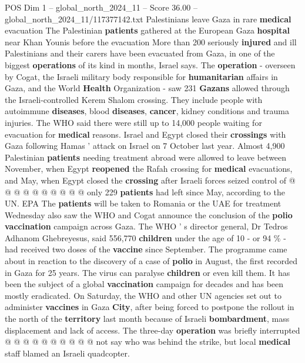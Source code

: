 \begin{textsample}{POS Dim 1 – global\_north\_2024\_11 – Score 36.00 – global\_north\_2024\_11/117377142.txt}  \label{ex:f1_pos_336}
Palestinians leave Gaza in rare \textbf{medical} evacuation The Palestinian \textbf{patients} gathered at the European Gaza \textbf{hospital} near Khan Younis before the evacuation More than 200 seriously \textbf{injured} and ill Palestinians and their carers have been evacuated from Gaza, in one of the biggest \textbf{operations} of its kind in months, Israel says.
The \textbf{operation} - overseen by Cogat, the Israeli military body responsible for \textbf{humanitarian} affairs in Gaza, and the World \textbf{Health} Organization - saw 231 \textbf{Gazans} allowed through the Israeli-controlled Kerem Shalom crossing.
They include people with autoimmune \textbf{diseases}, blood \textbf{diseases}, \textbf{cancer}, kidney conditions and trauma injuries.
The WHO said there were still up to 14,000 people waiting for evacuation for \textbf{medical} reasons.
Israel and Egypt closed their \textbf{crossings} with Gaza following Hamas ' attack on Israel on 7 October last year.
Almost 4,900 Palestinian \textbf{patients} needing treatment abroad were allowed to leave between November, when Egypt \textbf{reopened} the Rafah crossing for \textbf{medical} evacuations, and May, when Egypt closed the \textbf{crossing} after Israeli forces seized control of @ @ @ @ @ @ @ @ @ @ only 229 \textbf{patients} had left since May, according to the UN.
EPA The \textbf{patients} will be taken to Romania or the UAE for treatment Wednesday also saw the WHO and Cogat announce the conclusion of the \textbf{polio} \textbf{vaccination} campaign across Gaza.
The WHO ' s director general, Dr Tedros Adhanom Ghebreyesus, said 556,770 \textbf{children} under the age of 10 - or 94 \% - had received two doses of the \textbf{vaccine} since September.
The programme came about in reaction to the discovery of a case of \textbf{polio} in August, the first recorded in Gaza for 25 years.
The virus can paralyse \textbf{children} or even kill them.
It has been the subject of a global \textbf{vaccination} campaign for decades and has been mostly eradicated.
On Saturday, the WHO and other UN agencies set out to administer \textbf{vaccines} in Gaza \textbf{City}, after being forced to postpone the rollout in the north of the \textbf{territory} last month because of Israeli \textbf{bombardment}, mass displacement and lack of access.
The three-day \textbf{operation} was briefly interrupted @ @ @ @ @ @ @ @ @ @ not say who was behind the strike, but local \textbf{medical} staff blamed an Israeli quadcopter.

\end{textsample}
